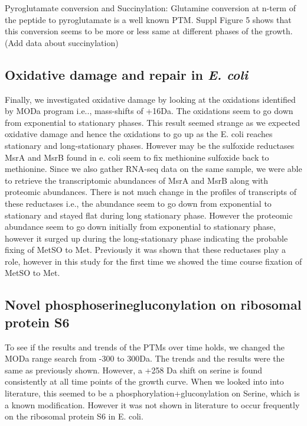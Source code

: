 \documentclass[12pt]{article}
\begin{document}
Pyroglutamate conversion and Succinylation:
Glutamine conversion at n-term of the peptide to pyroglutamate is a well known PTM. Suppl Figure 5 shows that this conversion seems to be more or less same at different phases of the growth. (Add data about succinylation)

\subsection{Oxidative damage and repair in \emph{E. coli}}
Finally, we investigated oxidative damage by looking at the oxidations identified by MODa program i.e.., mass-shifts of +16Da. The oxidations seem to go down from exponential to stationary phases. This result seemed strange as we expected oxidative damage and hence the oxidations to go up as the E. coli reaches stationary and long-stationary phases. However may be the sulfoxide reductases MsrA and MsrB found in e. coli seem to fix methionine sulfoxide back to methionine. Since we also gather RNA-seq data on the same sample, we were able to retrieve the transcriptomic abundances of MsrA and MsrB along with proteomic abundances. There is not much change in the profiles of transcripts of these reductases i.e., the abundance seem to go down from exponential to stationary and stayed flat during long stationary phase. However the proteomic abundance seem to go down initially from exponential to stationary phase, however it surged up during the long-stationary phase indicating the probable fixing of MetSO to Met. Previously it was shown that these reductases play a role, however in this study for the first time we showed the time course fixation of MetSO to Met.



\subsection{Novel phosphoserinegluconylation on ribosomal protein S6}
To see if the results and trends of the PTMs over time holds, we changed the MODa range search from -300 to 300Da. The trends and the results were the same as previously shown. However, a +258 Da shift on serine is found consistently at all time points of the growth curve. When we looked into into literature, this seemed to be a phosphorylation+gluconylation on Serine, which is a known modification. However it was not shown in literature to occur frequently on the ribosomal protein S6 in E. coli.
\end{document}
